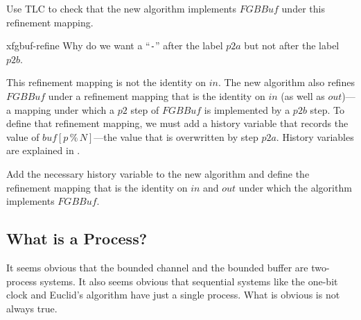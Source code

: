 \documentclass[fleqn,leqno]{article}
\begin{document}
Use TLC to check that the new algorithm implements $FGBBuf$ under this
refinement mapping.
%
\begin{aquestion}{xfgbuf-refine}
Why do we want a ``\verb|-|'' after the label $p2a$ but not after the
label $p2b$.
\end{aquestion}
%
This refinement mapping is not the identity on $in$.  The new
algorithm also refines $FGBBuf$ under a refinement mapping that is the
identity on $in$ (as well as $out$)---a mapping under which a $p2$
step of $FGBBuf$ is implemented by a $p2b$ step.  To define that
refinement mapping, we must add a history variable that records the
value of $buf[p\,\%\,N]$---the value that is overwritten by step
$p2a$.  History variables are explained in
.
\begin{question}
Add the necessary history variable to the new algorithm and define the
refinement mapping that is the identity on $in$ and $out$ under which
the algorithm implements $FGBBuf$.
\end{question}
 

  \vspace{-1.5\baselineskip}%
\subsection{What is a Process?}

It seems obvious that the bounded channel and the bounded buffer
are two-process systems.  It also seems obvious that sequential
systems like the one-bit clock and Euclid's algorithm have just a
single process.  What is obvious is not always true.
\end{document}
